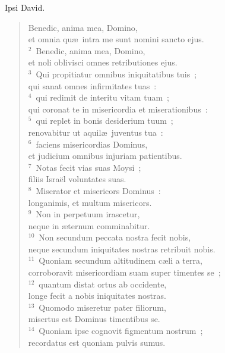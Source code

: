 \lettrine[lines=3,image=true,loversize=0.05,lraise=-0.03]{I}{}psi David. \begin{flushleft}\begin{verse}\vspace{6pt}Benedic, anima mea, Domino,\\ et omnia qu\ae\ intra me sunt nomini sancto ejus.\\
${}^{2}$~Benedic, anima mea, Domino,\\ et noli oblivisci omnes retributiones ejus.\\
${}^{3}$~Qui propitiatur omnibus iniquitatibus tuis~;\\ qui sanat omnes infirmitates tuas~:\\
${}^{4}$~qui redimit de interitu vitam tuam~;\\ qui coronat te in misericordia et miserationibus~:\\
${}^{5}$~qui replet in bonis desiderium tuum~;\\ renovabitur ut aquil\ae\ juventus tua~:\\
${}^{6}$~faciens misericordias Dominus,\\ et judicium omnibus injuriam patientibus.\\
${}^{7}$~Notas fecit vias suas Moysi~;\\ filiis Isra\"el voluntates suas.\\
${}^{8}$~Miserator et misericors Dominus~:\\ longanimis, et multum misericors.\\
${}^{9}$~Non in perpetuum irascetur,\\ neque in \ae ternum comminabitur.\\
${}^{10}$~Non secundum peccata nostra fecit nobis,\\ neque secundum iniquitates nostras retribuit nobis.\\
${}^{11}$~Quoniam secundum altitudinem c\ae li a terra,\\ corroboravit misericordiam suam super timentes se~;\\
${}^{12}$~quantum distat ortus ab occidente,\\ longe fecit a nobis iniquitates nostras.\\
${}^{13}$~Quomodo miseretur pater filiorum,\\ misertus est Dominus timentibus se.\\
${}^{14}$~Quoniam ipse cognovit figmentum nostrum~;\\ recordatus est quoniam pulvis sumus.\\

\end{verse}
\end{flushleft}
